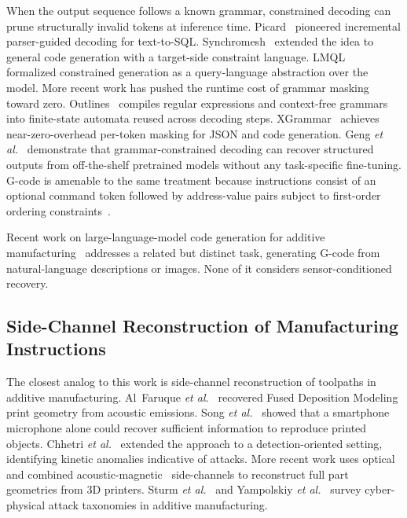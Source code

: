 \documentclass[sensors,article,submit,moreauthors,pdftex]{Definitions/mdpi}
\newcommand{\etal}{\textit{et al.}}
\begin{document}
When the output sequence follows a known grammar, constrained decoding can prune structurally invalid tokens at inference time. Picard~\cite{picard} pioneered incremental parser-guided decoding for text-to-SQL. Synchromesh~\cite{synchromesh} extended the idea to general code generation with a target-side constraint language. LMQL~\cite{lmql} formalized constrained generation as a query-language abstraction over the model. More recent work has pushed the runtime cost of grammar masking toward zero. Outlines~\cite{outlines} compiles regular expressions and context-free grammars into finite-state automata reused across decoding steps. XGrammar~\cite{xgrammar} achieves near-zero-overhead per-token masking for JSON and code generation. Geng \etal~\cite{geng2023gcd} demonstrate that grammar-constrained decoding can recover structured outputs from off-the-shelf pretrained models without any task-specific fine-tuning. G-code is amenable to the same treatment because instructions consist of an optional command token followed by address-value pairs subject to first-order ordering constraints~\cite{grammar_paper,gcode_foundational}.

Recent work on large-language-model code generation for additive manufacturing~\cite{gllm,image2gcode,chatcnc} addresses a related but distinct task, generating G-code from natural-language descriptions or images. None of it considers sensor-conditioned recovery.

\subsection{Side-Channel Reconstruction of Manufacturing Instructions}
\label{sec:related-sidechan}

The closest analog to this work is side-channel reconstruction of toolpaths in additive manufacturing. Al~Faruque \etal~\cite{alfaruque2016acoustic} recovered Fused Deposition Modeling print geometry from acoustic emissions. Song \etal~\cite{song2016my} showed that a smartphone microphone alone could recover sufficient information to reproduce printed objects. Chhetri \etal~\cite{chhetri2016kcad} extended the approach to a detection-oriented setting, identifying kinetic anomalies indicative of attacks. More recent work uses optical~\cite{chattopadhyay2025video} and combined acoustic-magnetic~\cite{jamarani2024screg} side-channels to reconstruct full part geometries from 3D printers. Sturm \etal~\cite{sturm2014cyber} and Yampolskiy \etal~\cite{yampolskiy2018security} survey cyber-physical attack taxonomies in additive manufacturing.
\end{document}
